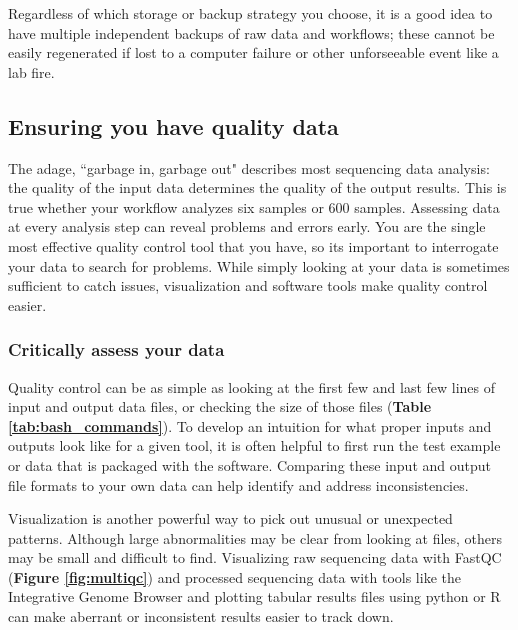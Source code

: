 \documentclass[10pt,letterpaper]{article}
\begin{document}
Regardless of which storage or backup strategy you choose, it is a good idea to have multiple independent backups of raw data and workflows; these cannot be easily regenerated if lost to a computer failure or other unforseeable event like a lab fire. 

\subsection*{Ensuring you have quality data} %

The adage, ``garbage in, garbage out" describes most sequencing data analysis: the quality of the input data determines the quality of the output results. 
This is true whether your workflow analyzes six samples or 600 samples.
Assessing data at every analysis step can reveal problems and errors early. 
You are the single most effective quality control tool that you have, so its important to interrogate your data to search for problems. 
While simply looking at your data is sometimes sufficient to catch issues, visualization and software tools make quality control easier. 



\subsubsection*{Critically assess your data}
Quality control can be as simple as looking at the first few and last few lines of input and output data files, or checking the size of those files (\textbf{Table \ref{tab:bash_commands}}). 
To develop an intuition for what proper inputs and outputs look like for a given tool, it is often helpful to first run the test example or data that is packaged with the software. 
Comparing these input and output file formats to your own data can help identify and address inconsistencies. 

Visualization is another powerful way to pick out unusual or unexpected patterns. 
Although large abnormalities may be clear from looking at files, others may be small and difficult to find. 
Visualizing raw sequencing data with FastQC (\textbf{Figure \ref{fig:multiqc}}) and processed sequencing data with tools like the Integrative Genome Browser and plotting tabular results files using python or R can make aberrant or inconsistent results easier to track down.
\end{document}
